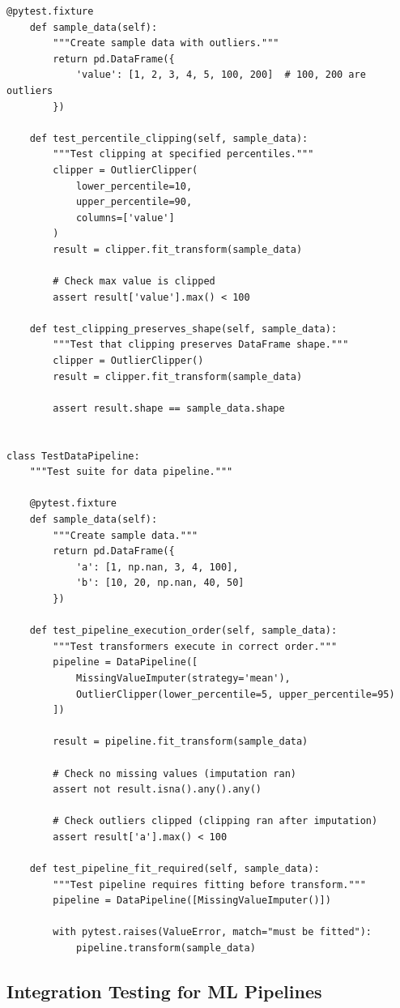 \begin{lstlisting}[style=python, caption=Unit tests for data processing]
    @pytest.fixture
    def sample_data(self):
        """Create sample data with outliers."""
        return pd.DataFrame({
            'value': [1, 2, 3, 4, 5, 100, 200]  # 100, 200 are outliers
        })

    def test_percentile_clipping(self, sample_data):
        """Test clipping at specified percentiles."""
        clipper = OutlierClipper(
            lower_percentile=10,
            upper_percentile=90,
            columns=['value']
        )
        result = clipper.fit_transform(sample_data)

        # Check max value is clipped
        assert result['value'].max() < 100

    def test_clipping_preserves_shape(self, sample_data):
        """Test that clipping preserves DataFrame shape."""
        clipper = OutlierClipper()
        result = clipper.fit_transform(sample_data)

        assert result.shape == sample_data.shape


class TestDataPipeline:
    """Test suite for data pipeline."""

    @pytest.fixture
    def sample_data(self):
        """Create sample data."""
        return pd.DataFrame({
            'a': [1, np.nan, 3, 4, 100],
            'b': [10, 20, np.nan, 40, 50]
        })

    def test_pipeline_execution_order(self, sample_data):
        """Test transformers execute in correct order."""
        pipeline = DataPipeline([
            MissingValueImputer(strategy='mean'),
            OutlierClipper(lower_percentile=5, upper_percentile=95)
        ])

        result = pipeline.fit_transform(sample_data)

        # Check no missing values (imputation ran)
        assert not result.isna().any().any()

        # Check outliers clipped (clipping ran after imputation)
        assert result['a'].max() < 100

    def test_pipeline_fit_required(self, sample_data):
        """Test pipeline requires fitting before transform."""
        pipeline = DataPipeline([MissingValueImputer()])

        with pytest.raises(ValueError, match="must be fitted"):
            pipeline.transform(sample_data)
\end{lstlisting}

\subsection{Integration Testing for ML Pipelines}

